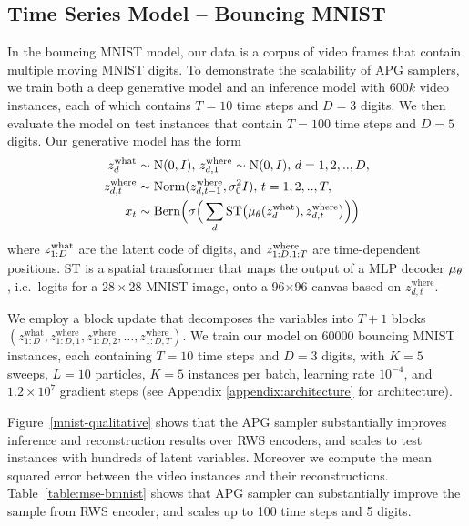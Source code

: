 \documentclass{article}
\theoremstyle{definition}
\begin{document}
\subsection{Time Series Model -- Bouncing MNIST}
In the bouncing MNIST model, our data is a corpus of video frames that contain multiple moving MNIST digits. To demonstrate the scalability of APG samplers, we train both a deep generative model and an inference model with $600k$ video instances, each of which contains $T=10$ time steps and $D=3$ digits.  We then evaluate the model on test instances that contain $T=100$ time steps and $D=5$ digits. Our generative model has the form
\begin{align*}
    z^{\mathrm{what}}_{d} 
    &\sim 
    \text{N}(0, I)
    ,
    \,
    z^{\mathrm{where}}_{d, 1} \sim \text{N}(0, I)
    ,
    \,
    d=1, 2,.., D,
    \\
    z^{\mathrm{where}}_{d, t} 
    &\sim 
    \text{Norm}(z^{\mathrm{where}}_{d, t - 1}, \sigma^2_0 I),
    \,
    t=1, 2,.., T,   
    \\
    x_t 
    &\sim
    \mathrm{Bern}
    \Big(
        \sigma
        \Big(
            \sum_{d} \mathrm{ST}
            \big(
                \mu_\theta(z^{\mathrm{what}}_d), 
                z^{\mathrm{where}}_{d, t}
            \big)
        \Big)
    \Big)
\end{align*}
where $z_{1:D}^{\mathrm{what}}$ are the latent code of digits, and $z_{1:D, 1:T}^{\mathrm{where}}$ are time-dependent positions. ST is a spatial transformer \cite{jaderberg2015spatial} that maps the output of a MLP decoder $\mu_\theta$, i.e.~logits for a $28\times28$ MNIST image, onto a 96$\times$96 canvas based on $z^{\mathrm{where}}_{d, t}$. 

We employ a block update that decomposes the variables into $T + 1$ blocks $(z_{1:D}^{\mathrm{what}}, z_{1:D, 1}^{\mathrm{where}}, z_{1:D, 2}^{\mathrm{where}}, \dotsc, z_{1:D, T}^{\mathrm{where}})$. We train our model on 60000 bouncing MNIST instances, each containing $T=10$ time steps and $D=3$ digits, with $K=5$ sweeps, $L=10$ particles, $K=5$ instances per batch, learning rate $10^{-4}$, and $1.2\times10^7$ gradient steps (see Appendix \ref{appendix:architecture} for architecture).

Figure~\ref{mnist-qualitative} shows that the APG sampler substantially improves inference and reconstruction results over RWS encoders, and scales to test instances with hundreds of latent variables. Moreover we compute the mean squared error between the video instances and their reconstructions. Table~\ref{table:mse-bmnist} shows that APG sampler can substantially improve the sample from RWS encoder, and scales up to 100 time steps and 5 digits.
\end{document}
